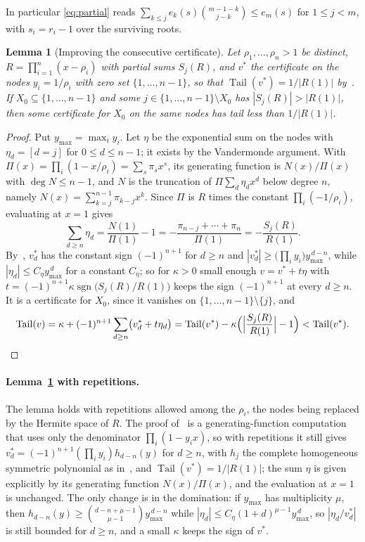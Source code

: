 \documentclass[11pt]{article}
\newtheorem{lemma}[theorem]{Lemma}
\theoremstyle{definition}
\theoremstyle{plain}
\DeclareMathOperator{\Tail}{Tail}
\DeclareMathOperator{\sgn}{sgn}
\begin{document}
In particular \eqref{eq:partial} reads
$\sum_{k\le j}e_k(s)\binom{m-1-k}{j-k}\le e_m(s)$ for $1\le j<m$, with
$s_i=r_i-1$ over the surviving roots.

\begin{lemma}[Improving the consecutive certificate]\label{lem:improve}
Let $\rho_1,\ldots,\rho_n>1$ be distinct, $R=\prod_{i=1}^n(x-\rho_i)$ with
partial sums $S_j(R)$, and $v^*$ the certificate on the nodes $y_i=1/\rho_i$ with
zero set $\{1,\ldots,n-1\}$, so that $\Tail(v^*)=1/|R(1)|$ by~\cite[Lemma~2.1]{coefficient-mass}.  If
$X_0\subseteq\{1,\ldots,n-1\}$ and some $j\in\{1,\ldots,n-1\}\setminus X_0$
has $|S_j(R)|>|R(1)|$, then some certificate for $X_0$ on the same nodes has
tail less than $1/|R(1)|$.
\end{lemma}

\begin{proof}
Put $y_{\max}=\max_iy_i$.  Let $\eta$ be the exponential sum on the nodes with
$\eta_d=[d=j]$ for $0\le d\le n-1$; it exists by the Vandermonde argument.
With $\Pi(x)=\prod_i(1-x/\rho_i)=\sum_s\pi_sx^s$, its generating function is
$N(x)/\Pi(x)$ with $\deg N\le n-1$, and $N$ is the truncation of
$\Pi\sum_d\eta_dx^d$ below degree $n$, namely
$N(x)=\sum_{k=j}^{n-1}\pi_{k-j}x^k$.  Since $\Pi$ is $R$ times the constant
$\prod_i(-1/\rho_i)$, evaluating at $x=1$ gives
\[
  \sum_{d\ge n}\eta_d=\frac{N(1)}{\Pi(1)}-1
  =-\frac{\pi_{n-j}+\cdots+\pi_n}{\Pi(1)}
  =-\frac{S_j(R)}{R(1)} .
\]
By~\cite[Lemma~2.1]{coefficient-mass}, $v^*_d$ has the constant sign $(-1)^{n+1}$ for $d\ge n$
and $|v^*_d|\ge\bigl(\prod_iy_i\bigr)y_{\max}^{\,d-n}$, while
$|\eta_d|\le C_\eta y_{\max}^{\,d}$ for a constant $C_\eta$; so for
$\kappa>0$ small enough $v=v^*+t\eta$ with
$t=(-1)^{n+1}\kappa\sgn\bigl(S_j(R)/R(1)\bigr)$ keeps the sign
$(-1)^{n+1}$ at every $d\ge n$.  It is a certificate for $X_0$, since it vanishes
on $\{1,\ldots,n-1\}\setminus\{j\}$, and
\[
  \Tail(v)=\kappa+(-1)^{n+1}\sum_{d\ge n}\bigl(v^*_d+t\eta_d\bigr)
  =\Tail(v^*)-\kappa\Bigl(\Bigl|\frac{S_j(R)}{R(1)}\Bigr|-1\Bigr)
  <\Tail(v^*).
\]
\end{proof}

\paragraph{Lemma~\ref{lem:improve} with repetitions.}  The lemma holds with
repetitions allowed among the $\rho_i$, the nodes being replaced by the
Hermite space of $R$.  The proof of~\cite[Lemma~2.1]{coefficient-mass} is a generating-function
computation that uses only the denominator $\prod_i(1-y_ix)$, so with
repetitions it still gives
$v^*_d=(-1)^{n+1}(\prod_iy_i)h_{d-n}(y)$ for $d\ge n$, with $h_j$ the complete
homogeneous symmetric polynomial as in~\cite[Lemma~2.1]{coefficient-mass}, and
$\Tail(v^*)=1/|R(1)|$; the sum $\eta$ is given explicitly by its generating
function $N(x)/\Pi(x)$, and the evaluation at $x=1$ is unchanged.  The only
change is in the domination: if $y_{\max}$ has multiplicity $\mu$, then
$h_{d-n}(y)\ge\binom{d-n+\mu-1}{\mu-1}y_{\max}^{\,d-n}$ while
$|\eta_d|\le C_\eta(1+d)^{\mu-1}y_{\max}^{\,d}$, so $|\eta_d/v^*_d|$ is still
bounded for $d\ge n$, and a small $\kappa$ keeps the sign of $v^*$.
\end{document}
